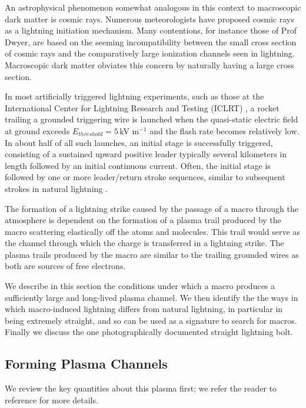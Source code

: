 \documentclass[%
 reprint,
 amsmath,amssymb,
 aps,
]{revtex4-2}
\begin{document}
    An astrophysical phenomenon somewhat analogous in this context to macroscopic dark matter is cosmic rays. Numerous meteorologists have proposed cosmic rays as a lightning initiation mechanism. Many contentions, for instance those of Prof Dwyer, are based on the seeming incompatibility between the small cross section of cosmic rays and the comparatively large ionization channels seen in lightning. Macroscopic dark matter obviates this concern by naturally having a large cross section.

    In most artificially triggered lightning experiments, such as those at the International Center for Lightning Research and Testing (ICLRT) \cite{Hill2012, Hill2013}, a rocket trailing a grounded triggering wire is launched when the quasi-static electric field at ground exceeds $E_{threshold} = 5\,$kV m$^{-1}$ and the flash rate becomes relatively low. In about half of all such launches, an initial stage is successfully triggered, consisting of a sustained upward positive leader typically several kilometers in length followed by an initial continuous current. Often, the initial stage is followed by one or more leader/return stroke sequences, similar to subsequent strokes in natural lightning \cite{Wang1999, rocket2012}. 

    The formation of a lightning strike caused by the passage of a macro through the atmosphere is dependent on the formation of a plasma trail produced by the macro scattering elastically off the atoms and molecules. This trail would serve as the channel through which the charge is transferred in a lightning strike. The plasma trails produced by the macro are similar to the trailing grounded wires as both are sources of free electrons.  

    We describe in this section the conditions under which a macro produces a sufficiently large and long-lived plasma channel.  We then identify the the ways in which macro-induced lightning differs from natural lightning, in particular in being extremely straight, and so can be used as a signature to search for macros.  Finally we discuss the one photographically documented straight lightning bolt.

    \subsection{Forming Plasma Channels} %
    \label{sub:macro_induced_plasma_channels}

        We review the key quantities about this plasma first; we refer the reader to reference \cite{Sidhu2018auv} for more details.
\end{document}
